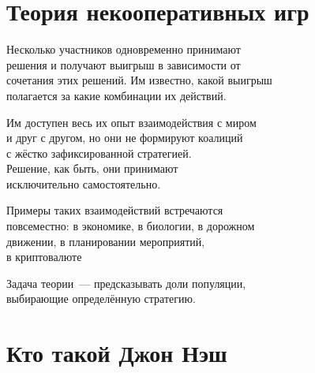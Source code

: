 \documentclass[11pt,aspectratio=43,svgnames]{beamer}
\begin{document}
 \maketitle

\begin{frame} 
	\tableofcontents
\end{frame}

\section{Теория некооперативных игр}

\begin{frame} 
Несколько участников одновременно принимают\\
решения и получают выигрыш в зависимости от\\
сочетания этих решений. Им известно, какой выигрыш\\
полагается за какие комбинации их действий. \medskip

Им доступен весь их опыт взаимодействия с миром\\
и друг с другом, но они не формируют коалиций\\
с жёстко зафиксированной стратегией.\\
Решение, как быть, они принимают\\
исключительно самостоятельно.
\end{frame}

\begin{frame} 
Примеры таких взаимодействий встречаются\\
повсеместно: в экономике, в биологии, в дорожном\\
движении, в планировании мероприятий,\\
в криптовалюте \medskip

Задача теории~— предсказывать доли популяции,\\
выбирающие определённую стратегию.
\end{frame}



\section{Кто такой Джон Нэш}
\end{document}
